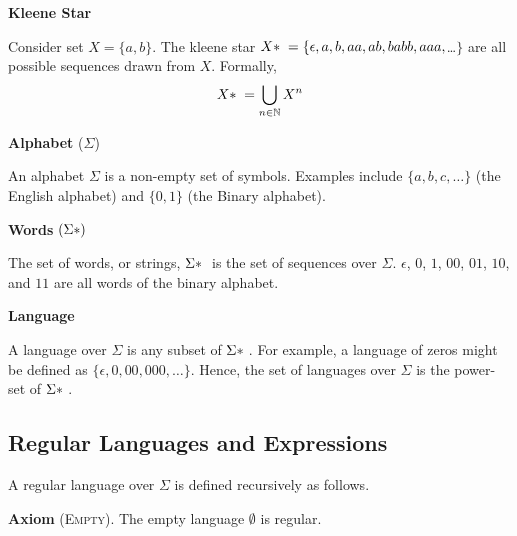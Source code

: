 \begin{minipage}[t]{0.2\textwidth}
    \textbf{\textsf{Kleene Star}}
\end{minipage}%
\begin{minipage}[t]{0.8\textwidth}
Consider set $X = \{a, b\}$. The kleene star $X \* = \{\epsilon, a, b, aa, ab, ba bb, aaa, $\ldots$\}$ are all possible sequences drawn from $X$. Formally,
\[X\* = \bigcup_{n \in \mathbb{N}} X^n\]
\end{minipage}\par

\begin{minipage}[t]{0.2\textwidth}
    \textbf{\textsf{Alphabet}} ($\Sigma$)
\end{minipage}%
\begin{minipage}[t]{0.8\textwidth}
An alphabet $\Sigma$ is a non-empty set of symbols. Examples include $\{ a, b, c, \ldots \}$ (the English alphabet) and $\{ 0, 1 \}$ (the Binary alphabet).
\end{minipage}\par

\begin{minipage}[t]{0.2\textwidth}
    \textbf{\textsf{Words}} $(\Sigma \*)$
\end{minipage}%
\begin{minipage}[t]{0.8\textwidth}
The set of words, or strings, $\Sigma \*$ is the set of sequences over $\Sigma$. $\epsilon$, $0$, $1$, $00$, $01$, $10$, and $11$ are all words of the binary alphabet.
\end{minipage}\par

\begin{minipage}[t]{0.2\textwidth}
    \textbf{\textsf{Language}}
\end{minipage}%
\begin{minipage}[t]{0.8\textwidth}
A language over $\Sigma$ is any subset of $\Sigma\*$. For example, a language of zeros might be defined as $\{ \epsilon, 0, 00, 000, \ldots \}$. Hence, the set of languages over $\Sigma$ is the power-set of $\Sigma\*$. 
\end{minipage}

\subsection{Regular Languages and Expressions}
A regular language over $\Sigma$ is defined recursively as follows. 

\textsf{\textbf{Axiom}} \textsc{(Empty)}. The empty language $\emptyset$ is regular.

